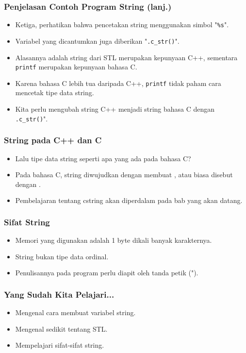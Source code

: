 \begin{frame}
\frametitle{Penjelasan Contoh Program String (lanj.)}
\begin{itemize}
  \item Ketiga, perhatikan bahwa pencetakan string menggunakan simbol "\texttt{\%s}".
  \item Variabel yang dicantumkan juga diberikan "\texttt{.c\_str()}".
  \item Alasannya adalah string dari STL merupakan kepunyaan C++, sementara \texttt{printf} merupakan kepunyaan bahasa C.
  \item Karena bahasa C lebih tua daripada C++, \texttt{printf} tidak paham cara mencetak tipe data string.
  \item Kita perlu mengubah string C++ menjadi string bahasa C dengan \texttt{.c\_str()}".
\end{itemize}
\end{frame}

\begin{frame}
\frametitle{String pada C++ dan C}
\begin{itemize}
  \item Lalu tipe data string seperti apa yang ada pada bahasa C?
  \item Pada bahasa C, string diwujudkan dengan membuat , atau biasa disebut dengan .
  \item Pembelajaran tentang cstring akan diperdalam pada bab yang akan datang.
\end{itemize}
\end{frame}

\begin{frame}
\frametitle{Sifat String}
\begin{itemize}
  \item Memori yang digunakan adalah 1 byte dikali banyak karakternya.
  \item String bukan tipe data ordinal.
  \item Penulisannya pada program perlu diapit oleh tanda petik (").
\end{itemize}
\end{frame}

\begin{frame}
\frametitle{Yang Sudah Kita Pelajari...}
\begin{itemize}
  \item Mengenal cara membuat variabel string.
  \item Mengenal sedikit tentang STL.
  \item Mempelajari sifat-sifat string.
\end{itemize}
\end{frame}


